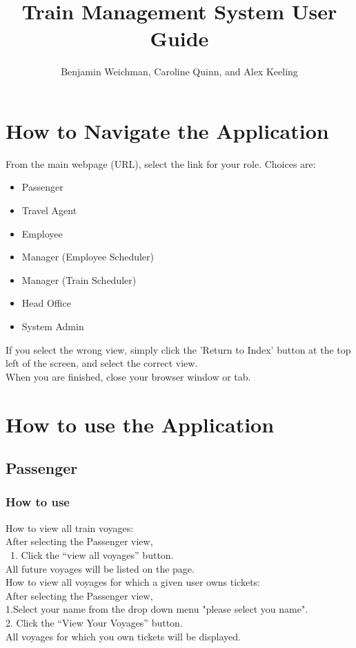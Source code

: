 \documentclass[letter]{article}
\title{Train Management System User Guide}
\author{Benjamin Weichman, Caroline Quinn, and Alex Keeling}
\date{}
\begin{document}
\maketitle

\section{How to Navigate the Application}
From the main webpage (URL), select the link for your role. Choices are: 
\begin{itemize}
\item Passenger
\item Travel Agent
\item Employee
\item Manager (Employee Scheduler)
\item Manager (Train Scheduler)
\item Head Office
\item System Admin
\end{itemize}

If you select the wrong view, simply click the 'Return to Index' button at the top left of the screen, and select the correct view. \\

When you are finished, close your browser window or tab.


\section{How to use the Application}

\subsection{Passenger}
\subsubsection{How to use}

How to view all train voyages:\\ 
After selecting the Passenger view,\\\
1. Click the “view all voyages” button.\\
All future voyages will be listed on the page.\\ 

How to view all voyages for which a given user owns tickets:\\
After selecting the Passenger view, \\
1.Select your name from the drop down menu "please select you name".\\
2. Click the “View Your Voyages” button.\\
All voyages for which you own tickets will be displayed. 
\end{document}
